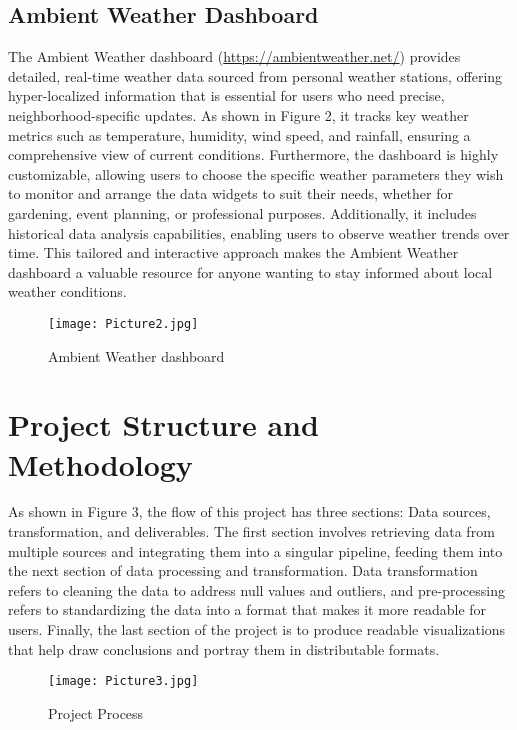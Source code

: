 \documentclass[a4paper, 12pt]{article}
\begin{document}
\subsection{Ambient Weather Dashboard}
\label{subsec:ambient-weather-dashboard}

The Ambient Weather dashboard (\url{https://ambientweather.net/}) provides detailed, real-time weather data sourced from personal weather stations, offering hyper-localized information that is essential for users who need precise, neighborhood-specific updates. As shown in Figure 2, it tracks key weather metrics such as temperature, humidity, wind speed, and rainfall, ensuring a comprehensive view of current conditions. Furthermore, the dashboard is highly customizable, allowing users to choose the specific weather parameters they wish to monitor and arrange the data widgets to suit their needs, whether for gardening, event planning, or professional purposes. Additionally, it includes historical data analysis capabilities, enabling users to observe weather trends over time. This tailored and interactive approach makes the Ambient Weather dashboard a valuable resource for anyone wanting to stay informed about local weather conditions.

\begin{figure}[h!]
\centering
\texttt{[image: Picture2.jpg]} %
\caption{Ambient Weather dashboard}
\label{fig:ambient-dashboard}
\end{figure}


\section{Project Structure and Methodology}
\label{sec:project-structure}
As shown in Figure 3, the flow of this project has three sections: Data sources, transformation, and deliverables. The first section involves retrieving data from multiple sources and integrating them into a singular pipeline, feeding them into the next section of data processing and transformation. Data transformation refers to cleaning the data to address null values and outliers, and pre-processing refers to standardizing the data into a format that makes it more readable for users. Finally, the last section of the project is to produce readable visualizations that help draw conclusions and portray them in distributable formats.

\begin{figure}[H]
\centering
\texttt{[image: Picture3.jpg]}
\caption{Project Process}
\label{fig:project-process}
\end{figure}
\end{document}
